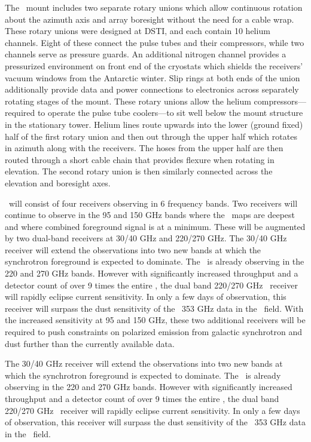 \documentclass[]{spie}  %
\begin{document}
The \biceparray\ mount includes two separate rotary unions which allow
continuous rotation about the azimuth axis and array boresight without the need for a
cable wrap. These rotary unions were designed at DSTI, and each contain 10
helium channels. Eight of these connect the pulse tubes and their compressors,
while two channels serve as pressure guards. An additional nitrogen channel
provides a pressurized environment on front end of the cryostats which shields
the receivers' vacuum windows from the Antarctic winter.  Slip rings at both
ends of the union additionally provide data and power connections to
electronics across separately rotating stages of the mount. These rotary unions
allow the helium compressors---required to operate the pulse tube coolers---to
sit well below the mount structure in the stationary tower. Helium lines route
upwards into the lower (ground fixed) half of the first rotary union and then
out through the upper half which rotates in azimuth along with the receivers.
The hoses from the upper half are then routed through a short cable chain that
provides flexure when rotating in elevation. The second rotary union is then
similarly connected across the elevation and boresight axes.



\biceparray\ will consist of four receivers observing in 6 frequency bands.
Two receivers will continue to observe in the 95 and 150 GHz bands where the
\bk\ maps are deepest and where combined foreground signal is at a minimum.
These will be augmented by two dual-band receivers at 30/40 GHz and 220/270
GHz.  The 30/40 GHz receiver will extend the observations into two new bands at
which the synchrotron foreground is expected to dominate. The \keckarray\ is
already observing in the 220 and 270 GHz bands.  However with significantly
increased throughput and a detector count of over 9 times the entire
\keckarray, the dual band 220/270 GHz \biceparray\ receiver will rapidly
eclipse current sensitivity. In only a few days of observation, this receiver
will surpass the dust sensitivity of the \planck\ 353 GHz data in the \bk\
field. With the increased sensitivity at 95 and 150 GHz, these two additional
receivers will be required to push constraints on polarized emission from
galactic synchrotron and dust further than the currently available data.





The 30/40 GHz receiver will extend the observations into two
new bands at which the synchrotron foreground is expected to dominate. The
\keckarray\ is already observing in the 220 and 270 GHz bands.  However with
significantly increased throughput and a detector count of over 9 times the
entire \keckarray, the dual band 220/270 GHz \biceparray\ receiver will rapidly
eclipse current sensitivity. In only a few days of observation,
this receiver will surpass the dust sensitivity of the \planck\ 353 GHz data in
the \bk\ field. 
\end{document}
